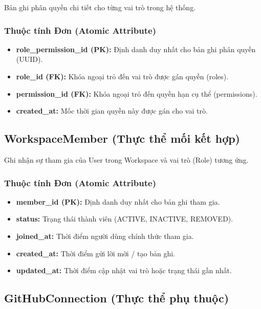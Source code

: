 Bản ghi phân quyền chi tiết cho từng vai trò trong hệ thống.

\subsubsection{Thuộc tính Đơn (Atomic Attribute)}

\begin{itemize}
    \item \textbf{role\_permission\_id (PK):} Định danh duy nhất cho bản ghi phân quyền (UUID).
    \item \textbf{role\_id (FK):} Khóa ngoại trỏ đến vai trò được gán quyền (roles).
    \item \textbf{permission\_id (FK):} Khóa ngoại trỏ đến quyền hạn cụ thể (permissions).
    \item \textbf{created\_at:} Mốc thời gian quyền này được gán cho vai trò.
\end{itemize}


\subsection{WorkspaceMember (Thực thể mối kết hợp)}

Ghi nhận sự tham gia của User trong Workspace và vai trò (Role) tương ứng.

\subsubsection{Thuộc tính Đơn (Atomic Attribute)}

\begin{itemize}
    \item \textbf{member\_id (PK):} Định danh duy nhất cho bản ghi tham gia.
    \item \textbf{status:} Trạng thái thành viên (ACTIVE, INACTIVE, REMOVED).
    \item \textbf{joined\_at:} Thời điểm người dùng chính thức tham gia.
    \item \textbf{created\_at:} Thời điểm gửi lời mời / tạo bản ghi.
    \item \textbf{updated\_at:} Thời điểm cập nhật vai trò hoặc trạng thái gần nhất.
\end{itemize}


\subsection{GitHubConnection (Thực thể phụ thuộc)}

